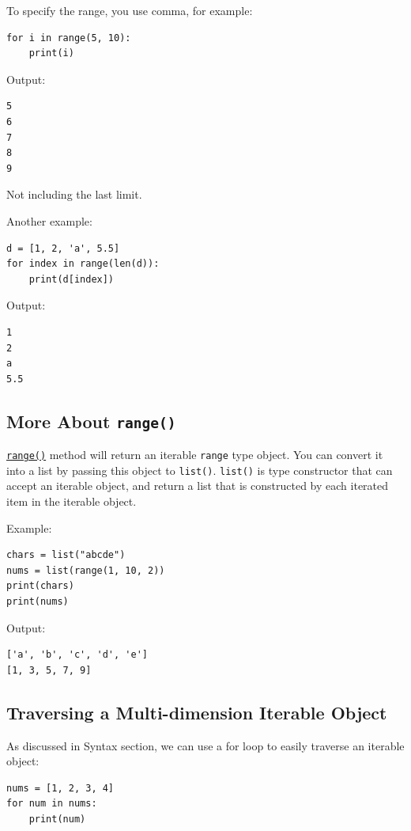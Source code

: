 \documentclass[12pt]{book}
\begin{document}
To specify the range, you use comma, for example:
\begin{verbatim}
for i in range(5, 10):
    print(i)
\end{verbatim}
Output:
\begin{verbatim}
5
6
7
8
9
\end{verbatim}
Not including the last limit.

Another example:
\begin{verbatim}
d = [1, 2, 'a', 5.5]
for index in range(len(d)):
    print(d[index])
\end{verbatim}
Output:
\begin{verbatim}
1
2
a
5.5
\end{verbatim}
\subsection{More About \texttt{range()}}
\label{sec:orgfd17b83}
\href{https://docs.python.org/3/library/stdtypes.html\#range}{\texttt{range()}} method will return an iterable \texttt{range} type object. You can convert it into a list by passing this object to \texttt{list()}. \texttt{list()} is type constructor that can accept an iterable object, and return a list that is constructed by each iterated item in the iterable object.

Example:
\begin{verbatim}
chars = list("abcde")
nums = list(range(1, 10, 2))
print(chars)
print(nums)
\end{verbatim}
Output:
\begin{verbatim}
['a', 'b', 'c', 'd', 'e']
[1, 3, 5, 7, 9]
\end{verbatim}
\subsection{Traversing a Multi-dimension Iterable Object}
\label{sec:org0998671}
As discussed in Syntax section, we can use a for loop to easily traverse an iterable object:
\begin{verbatim}
nums = [1, 2, 3, 4]
for num in nums:
    print(num)
\end{verbatim}
\end{document}
